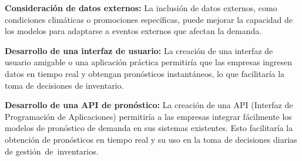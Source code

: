 \textbf{Consideración de datos externos:} La inclusión de datos externos, como condiciones climáticas o promociones específicas, puede mejorar la capacidad de los modelos para adaptarse a eventos externos que afectan la demanda.

\textbf{Desarrollo de una interfaz de usuario:} La creación de una interfaz de usuario amigable o una aplicación práctica permitiría que las empresas ingresen datos en tiempo real y obtengan pronósticos instantáneos, lo que facilitaría la toma de decisiones de inventario.



\textbf{Desarrollo de una API de pronóstico:} La creación de una API (Interfaz de Programación de Aplicaciones) permitiría a las empresas integrar fácilmente los modelos de pronóstico de demanda en sus sistemas existentes. Esto facilitaría la obtención de pronósticos en tiempo real y su uso en la toma de decisiones diarias de gestión de inventarios.

